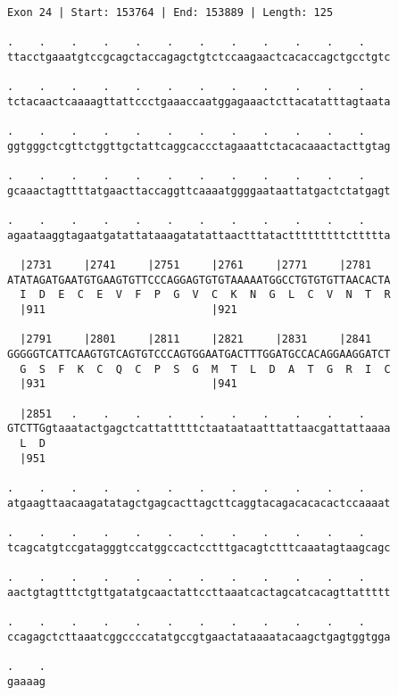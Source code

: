 \documentclass{article}
\begin{document}
\begin{Verbatim}
Exon 24 | Start: 153764 | End: 153889 | Length: 125
 
.    .    .    .    .    .    .    .    .    .    .    .    
ttacctgaaatgtccgcagctaccagagctgtctccaagaactcacaccagctgcctgtc
  
.    .    .    .    .    .    .    .    .    .    .    .    
tctacaactcaaaagttattccctgaaaccaatggagaaactcttacatatttagtaata
  
.    .    .    .    .    .    .    .    .    .    .    .    
ggtgggctcgttctggttgctattcaggcaccctagaaattctacacaaactacttgtag
  
.    .    .    .    .    .    .    .    .    .    .    .    
gcaaactagttttatgaacttaccaggttcaaaatggggaataattatgactctatgagt
  
.    .    .    .    .    .    .    .    .    .    .    .    
agaataaggtagaatgatattataaagatatattaactttatactttttttttcttttta
  
  |2731     |2741     |2751     |2761     |2771     |2781   
ATATAGATGAATGTGAAGTGTTCCCAGGAGTGTGTAAAAATGGCCTGTGTGTTAACACTA
  I  D  E  C  E  V  F  P  G  V  C  K  N  G  L  C  V  N  T  R
  |911                          |921                        
  
  |2791     |2801     |2811     |2821     |2831     |2841   
GGGGGTCATTCAAGTGTCAGTGTCCCAGTGGAATGACTTTGGATGCCACAGGAAGGATCT
  G  S  F  K  C  Q  C  P  S  G  M  T  L  D  A  T  G  R  I  C
  |931                          |941                        
  
  |2851   .    .    .    .    .    .    .    .    .    .    
GTCTTGgtaaatactgagctcattatttttctaataataatttattaacgattattaaaa
  L  D                                                      
  |951                                                      
  
.    .    .    .    .    .    .    .    .    .    .    .    
atgaagttaacaagatatagctgagcacttagcttcaggtacagacacacactccaaaat
  
.    .    .    .    .    .    .    .    .    .    .    .    
tcagcatgtccgatagggtccatggccactcctttgacagtctttcaaatagtaagcagc
  
.    .    .    .    .    .    .    .    .    .    .    .    
aactgtagtttctgttgatatgcaactattccttaaatcactagcatcacagttattttt
  
.    .    .    .    .    .    .    .    .    .    .    .    
ccagagctcttaaatcggccccatatgccgtgaactataaaatacaagctgagtggtgga
  
.    .
gaaaag
\end{Verbatim}
\newpage
\end{document}
